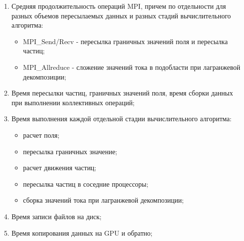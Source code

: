 \begin{enumerate}
	\item Средняя продолжительность операций MPI, причем по отдельности для разных объемов пересылаемых данных и разных стадий вычислительного алгоритма:
	\begin{itemize}
		\item MPI\_Send/Recv - пересылка граничных значений поля и пересылка частиц;
		\item MPI\_Allreduce - сложение значений тока в подобласти при лагранжевой декомпозиции;
		
	\end{itemize}	
	\item Время пересылки частиц, граничных значений поля, время сборки данных при выполнении коллективных операций;   
	\item Время выполнения каждой отдельной стадии вычислительного алгоритма:
	\begin{itemize}
		\item расчет поля; 
		\item пересылка граничных значение; 
		\item расчет движения частиц; 
		\item пересылка частиц в соседние процессоры; 
		\item сборка значений тока при лагранжевой декомпозиции;
	\end{itemize}
	\item Время записи файлов на диск;
	\item Время копирования данных на GPU и обратно;
	
\end{enumerate}



